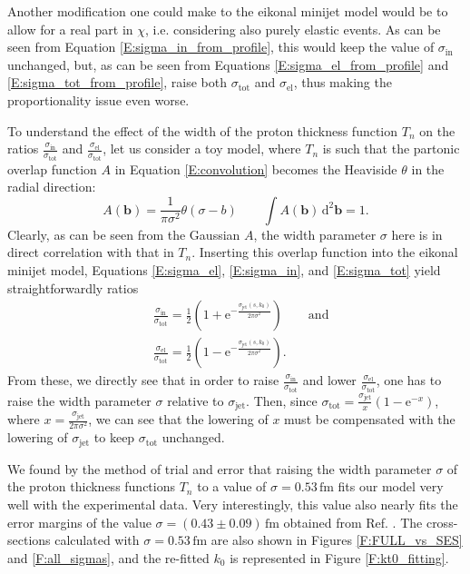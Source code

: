 \documentclass[a4paper, twoside, english, 12pt]{report}
\begin{document}
Another modification one could make to the eikonal minijet model would be to allow for a real part in $\chi$, i.e. considering also purely elastic events. As can be seen from Equation \eqref{E:sigma_in_from_profile}, this would keep the value of $\sigma_{\text{in}}$ unchanged, but, as can be seen from Equations \eqref{E:sigma_el_from_profile} and \eqref{E:sigma_tot_from_profile}, raise both $\sigma_{\text{tot}}$ and $\sigma_{\text{el}}$, thus making the proportionality issue even worse.

To understand the effect of the width of the proton thickness function $T_n$ on the ratios  $\frac{\sigma_\text{in}}{\sigma_\text{tot}}$ and $\frac{\sigma_\text{el}}{\sigma_\text{tot}}$, let us consider a toy model, where $T_n$ is such that the partonic overlap function $A$ in Equation \eqref{E:convolution} becomes the Heaviside $\theta$ in the radial direction:
\begin{equation}
A(\mathbf{b}) = \frac{1}{\pi\sigma^2} \theta(\sigma-b)\qquad  \int A(\mathbf{b}) \,\text{d}^2\mathbf{b} = 1.
\end{equation}
Clearly, as can be seen from the Gaussian $A$, the width parameter $\sigma$ here is in direct correlation with that in $T_n$. Inserting this overlap function into the eikonal minijet model, Equations \eqref{E:sigma_el}, \eqref{E:sigma_in}, and \eqref{E:sigma_tot} yield straightforwardly ratios
\begin{align}
&\frac{\sigma_\text{in}}{\sigma_\text{tot}} = \frac{1}{2}(1+\text{e}^{-\frac{\sigma_{\text{jet}}(s,k_0)}{2\pi\sigma^2}}) \qquad \text{and}\\
&\frac{\sigma_\text{el}}{\sigma_\text{tot}} = \frac{1}{2}(1-\text{e}^{-\frac{\sigma_{\text{jet}}(s,k_0)}{2\pi\sigma^2}}).
\end{align}
From these, we directly see that in order to raise $\frac{\sigma_\text{in}}{\sigma_\text{tot}}$ and lower $\frac{\sigma_\text{el}}{\sigma_\text{tot}}$, one has to raise the width parameter $\sigma$ relative to $\sigma_{\text{jet}}$. Then, since $\sigma_{\text{tot}} = \frac{\sigma_{\text{jet}}}{x}(1-\text{e}^{-x})$, where $x = \frac{\sigma_{\text{jet}}}{2\pi\sigma^2}$, we can see that the lowering of $x$ must be compensated with the lowering of $\sigma_{\text{jet}}$ to keep $\sigma_{\text{tot}}$ unchanged.

We found by the method of trial and error that raising the width parameter $\sigma$ of the proton thickness functions $T_n$ to a value of $\sigma = 0.53 \,\text{fm}$ fits our model very well with the experimental data. Very interestingly, this value also nearly fits the error margins of the value $\sigma=(0.43\pm0.09)\,\text{fm}$ obtained from Ref. \cite{zeuksen_pap}. The cross-sections calculated with $\sigma = 0.53 \,\text{fm}$ are also shown in Figures \ref{F:FULL_vs_SES} and \ref{F:all_sigmas}, and the re-fitted $k_0$ is represented in Figure \ref{F:kt0_fitting}.
\end{document}
